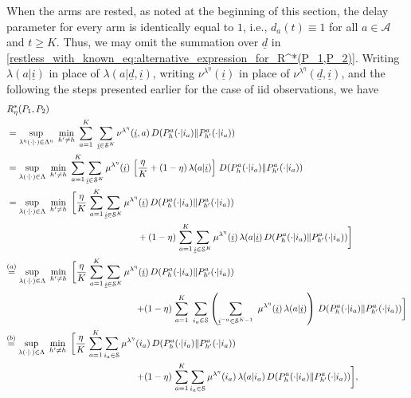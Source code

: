 When the arms are {rested}, as noted at the beginning of this section, the delay parameter for every arm is identically equal to $1$, i.e., $d_a(t)\equiv 1$ for all $a\in\mathcal{A}$ and $t\geq K$. Thus, we may omit the summation over $\underline{d}$ in \eqref{restless_with_known_eq:alternative_expression_for_R^*(P_1,P_2)}. Writing $\lambda(a|\underline{i})$ in place of $\lambda(a|\underline{d},\underline{i})$, writing $\nu^{\lambda^\eta}(\underline{i})$ in place of $\nu^{\lambda^\eta}(\underline{d},\underline{i})$, and the following the steps presented earlier for the case of iid observations, we have
\begingroup \allowdisplaybreaks\begin{align}
&R_\eta^*(P_1,P_2)\nonumber\\
&=\sup\limits_{\lambda^\eta(\cdot\mid\cdot)\in \Lambda^\eta}~ \min\limits_{h'\neq h} ~ \sum\limits_{a=1}^{K}~\sum\limits_{\underline{i}\in\mathcal{S}^K}  \nu^{\lambda^\eta}(\underline{i},a) \,D(P_h^a(\cdot|i_a)\|P_{h'}^a(\cdot|i_a))\nonumber\\
	&=\sup\limits_{\lambda(\cdot\mid\cdot)\in \Lambda}~ \min\limits_{h'\neq h} ~\sum\limits_{a=1}^{K} \sum\limits_{\underline{i}\in\mathcal{S}^K}\mu^{\lambda^\eta}(\underline{i})\,\left[\frac{\eta}{K}+(1-\eta)\,\lambda(a|\underline{i})\right]\,D(P_h^a(\cdot|i_a)\|P_{h'}^a(\cdot|i_a))\nonumber\\
	&=\sup\limits_{\lambda(\cdot\mid\cdot)\in \Lambda}~ \min\limits_{h'\neq h} ~\bigg[\frac{\eta}{K}\,\sum\limits_{a=1}^{K}\sum\limits_{\underline{i}\in\mathcal{S}^K}\mu^{\lambda^\eta}(\underline{i}) \,D(P_h^a(\cdot|i_a)\|P_{h'}^a(\cdot|i_a))\nonumber\\
	&\hspace{5cm}+(1-\eta)\,\sum\limits_{a=1}^{K} \sum\limits_{\underline{i}\in\mathcal{S}^K}\mu^{\lambda^\eta}(\underline{i})\,\lambda(a|\underline{i})\,D(P_h^a(\cdot|i_a)\|P_{h'}^a(\cdot|i_a))\bigg]\nonumber\\
	&{\color{black} \stackrel{(a)}{=}\sup\limits_{\lambda(\cdot\mid\cdot)\in \Lambda}~ \min\limits_{h'\neq h} ~\bigg[\frac{\eta}{K}\,\sum\limits_{a=1}^{K}\sum\limits_{\underline{i}\in\mathcal{S}^K}\mu^{\lambda^\eta}(\underline{i}) \,D(P_h^a(\cdot|i_a)\|P_{h'}^a(\cdot|i_a))}\nonumber\\
	&\hspace{5cm}{\color{black}+(1-\eta)\,\sum\limits_{a=1}^{K}~ \sum\limits_{i_a\in \mathcal{S}}\left(\sum\limits_{\underline{i}^{-a}\in \mathcal{S}^{K-1}}~\mu^{\lambda^\eta}(\underline{i})\,\lambda(a|\underline{i})\right)\,D(P_h^a(\cdot|i_a)\|P_{h'}^a(\cdot|i_a))\bigg]}\nonumber\\
	&{\color{black} \stackrel{(b)}{=}\sup\limits_{\lambda(\cdot\mid\cdot)\in \Lambda}~ \min\limits_{h'\neq h} ~\bigg[\frac{\eta}{K}\,\sum\limits_{a=1}^{K}\sum\limits_{i_a\in\mathcal{S}}\mu^{\lambda^\eta}(i_a) \,D(P_h^a(\cdot|i_a)\|P_{h'}^a(\cdot|i_a))}\nonumber\\
	&\hspace{5cm}{\color{black} +(1-\eta)\,\sum\limits_{a=1}^{K} \sum\limits_{i_a\in\mathcal{S}}\mu^{\lambda^\eta}(i_a)\,\lambda(a|i_a)\,D(P_h^a(\cdot|i_a)\|P_{h'}^a(\cdot|i_a))\bigg],}\label{restless_with_known_eq:D^*(delta,P_1,P_2)_rested_Markov_case_1}
\end{align}\endgroup

